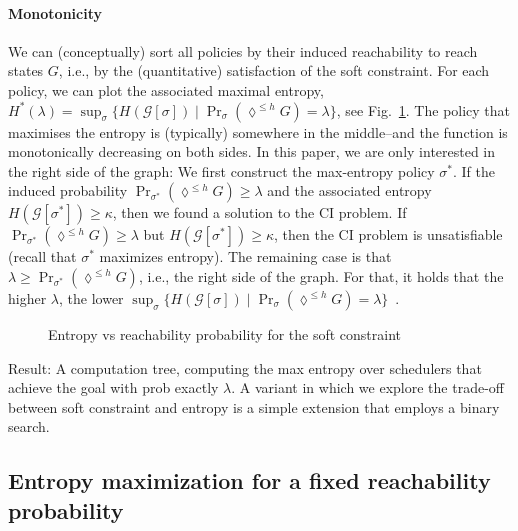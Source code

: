 \documentclass[conference]{IEEEtran}
\theoremstyle{remark}
\newcommand{\sg}{\mathcal{G}}
\newcommand{\eventually}[1]{\lozenge^{\leq #1}}
\newcommand{\sched}{\sigma}
\begin{document}
\paragraph{Monotonicity}
We can (conceptually) sort all policies by their induced reachability to reach states $G$, i.e., by the (quantitative) satisfaction of the soft constraint. For each policy, we can plot the associated maximal entropy, $H^*(\lambda) = \sup_{\sched} \{ H(\sg[\sched]) \mid \Pr_{\sched}(\eventually{h} G) = \lambda\}$, see Fig.~\ref{fig:entropyvspsat}.
The policy that maximises the entropy is (typically) somewhere in the middle--and the function is monotonically decreasing on both sides. 
In this paper, we are only interested in the right side of the graph:
We first construct the max-entropy policy $\sched^*$. If the induced probability $\Pr_{\sched^*}(\eventually{h} G) \geq \lambda$ and the associated entropy $H(\sg[\sched^*]) \geq \kappa$, then we found a solution to the CI problem. If $\Pr_{\sched^*}(\eventually{h} G) \geq \lambda$ but $H(\sg[\sched^*]) \geq \kappa$, then the CI problem is unsatisfiable (recall that $\sched^*$ maximizes entropy).
The remaining case is that $\lambda \geq \Pr_{\sched^*}(\eventually{h} G)$, i.e., the right side of the graph.
For that, it holds that the higher $\lambda$, the lower $\sup_{\sched} \{ H(\sg[\sched]) \mid \Pr_{\sched}(\eventually{h} G) = \lambda\}$~. 
\begin{figure}
\caption{Entropy vs reachability probability for the soft constraint}
\label{fig:entropyvspsat}
\end{figure}

Result: A computation tree, computing the max entropy over schedulers that achieve the goal with prob exactly $\lambda$.
A variant in which we explore the trade-off between soft constraint and entropy is a simple extension that employs a binary search.
\subsection{Entropy maximization for a fixed reachability probability}
\end{document}
